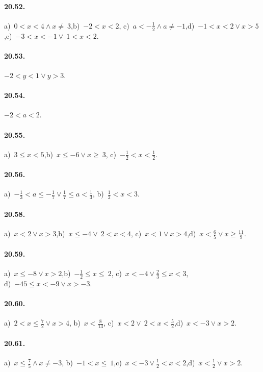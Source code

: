 \paragraph{20.52.} a)~$0<x<4\wedge x\neq~3$,\quad b)~$-2<x<2$,\quad
c)~$a<-{\frac{1}{2}}\wedge a\neq -1$,\quad d)~$-1<x<2\vee x>5$,\quad e)~$-3<x<-1\vee~1<x<2$.

\paragraph{20.53.} $-2<y<1\vee y>3$.

\paragraph{20.54.} $-2<a<2$.

\paragraph{20.55.} a)~$3\le x<5$,\quad b)~$x\le -6\vee x\ge~3$,\quad
c)~$-{\frac{1}{2}}<x<\frac{1}{2}$.

\paragraph{20.56.} a)~$-{\frac{1}{3}}<a\le -{\frac{1}{7}}\vee \frac{1}{7}\le a<\frac{1}{3}$,\quad
b)~$\frac{1}{2}<x<3$.

\paragraph{20.58.} a)~$x<2\vee x>3$,\quad b)~$x\le -4\vee~2<x<4$,\quad
c)~$x<1\vee x>4$,\quad d)~$x<\frac{6}{5}\vee x\ge\frac{11}{9}$.

\paragraph{20.59.} a)~$x\le -8\vee x>2$,\quad b)~$-{\frac{1}{2}}\le x\le~2$,\quad
c)~$x<-4\vee\frac{2}{3}\le x<3$,\quad \protect\\ d)~$-45\le x<-9\vee x>-3$.

\paragraph{20.60.} a)~$2<x\le \frac{7}{2}\vee x>4$,\quad
b)~$x<\frac{8}{13}$,\quad
c)~$x<2\vee~2<x<\frac{5}{2}$,\quad d)~$x<-3\vee x>2$.

\paragraph{20.61.} a)~$x\le \frac{7}{5}\wedge x\neq-3$,\quad
b)~$-1<x\le~1$,\quad c)~$x<-3\vee\frac{1}{2}<x<2$,\quad d)~$x<\frac{1}{2}\vee x>2$.

